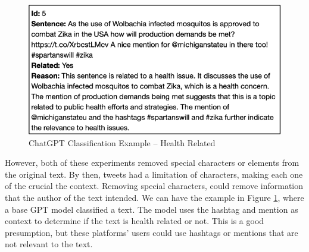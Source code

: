   \begin{figure}[!h]
    \centering
        \includegraphics[width=0.8\linewidth]{images/base_gpt_health.png}
        \caption{ChatGPT Classification Example – Health Related}
        \label{gpt_health}
\end{figure}

However, both of these experiments removed special characters or elements from the original text. By then, tweets had a limitation of characters, making each one of the crucial the context. Removing special
characters, could remove information that the author of the text intended. We can have the example in Figure \ref{gpt_health}, where a base GPT model  classified a text. The model uses the hashtag and mention
as context to determine if the text is health related or not. This is a good presumption, but these platforms' users could use hashtags or mentions that are not relevant to the text. 



